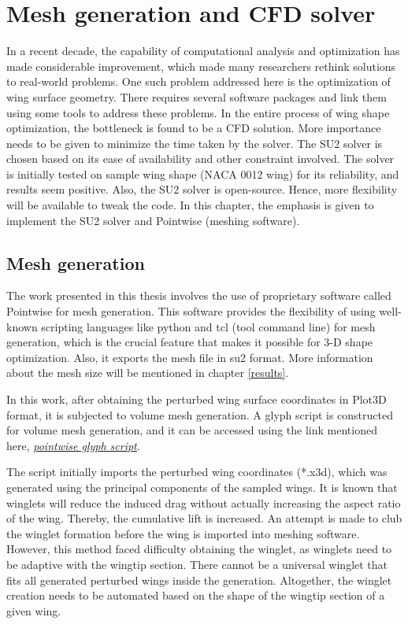 \chapter{Mesh generation and CFD solver}
\label{solver}

In a recent decade, the capability of computational analysis and optimization has made considerable improvement, which made many researchers rethink solutions to real-world problems. One such problem addressed here is the optimization of wing surface geometry. There requires several software packages and link them using some tools to address these problems. In the entire process of wing shape optimization, the bottleneck is found to be a CFD solution. More importance needs to be given to minimize the time taken by the solver. The SU2 solver is chosen based on its ease of availability and other constraint involved. The solver is initially tested on sample wing shape (NACA 0012 wing) for its reliability, and results seem positive. Also, the SU2 solver is open-source. Hence, more flexibility will be available to tweak the code. In this chapter, the emphasis is given to implement the SU2 solver and Pointwise (meshing software).

\section{Mesh generation}
The work presented in this thesis involves the use of proprietary software called Pointwise for mesh generation. This software provides the flexibility of using well-known scripting languages like python and tcl (tool command line) for mesh generation, which is the crucial feature that makes it possible for 3-D shape optimization. Also, it exports the mesh file in su2 format. More information about the mesh size will be mentioned in chapter \ref{results}.

In this work, after obtaining the perturbed wing surface coordinates in Plot3D format, it is subjected to volume mesh generation. A glyph script is constructed for volume mesh generation, and it can be accessed using the link mentioned here, \href{https://github.com/neelu065/M-Tech_project_code/blob/master/Project_code_fNRAND1/optimizer_input/pointwise_mesh_template.glf}{\underline{\textit{pointwise glyph script}}}. 

The script initially imports the perturbed wing coordinates (*.x3d), which was generated using the principal components of the sampled wings. It is known that winglets will reduce the induced drag without actually increasing the aspect ratio of the wing. Thereby, the cumulative lift is increased. An attempt is made to club the winglet formation before the wing is imported into meshing software. However, this method faced difficulty obtaining the winglet, as winglets need to be adaptive with the wingtip section. There cannot be a universal winglet that fits all generated perturbed wings inside the generation. Altogether, the winglet creation needs to be automated based on the shape of the wingtip section of a given wing.

